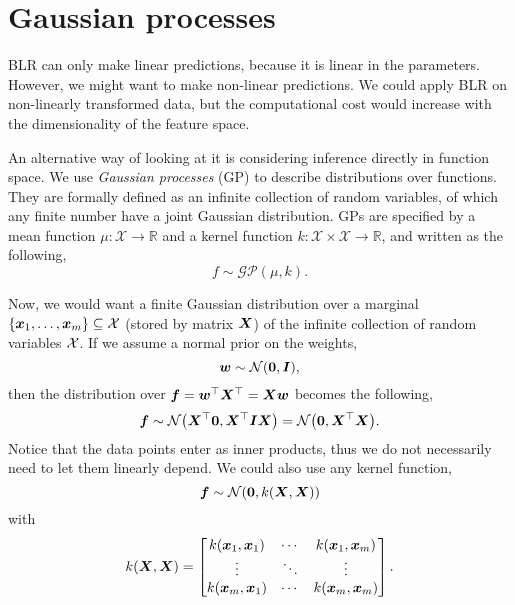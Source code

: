 \section{Gaussian processes}

BLR can only make linear predictions, because it is linear in the parameters.
However, we might want to make non-linear predictions. We could apply BLR on
non-linearly transformed data, but
the computational cost would increase with the dimensionality of the feature
space.

An alternative way of looking at it is considering inference directly in
function space. We use \textit{Gaussian processes} (GP) to describe
distributions over functions. They are formally defined as an infinite
collection of random variables, of which any finite number have a joint Gaussian
distribution. GPs are specified by a mean function $\mu:
\mathcal{X}\to\mathbb{R}$ and a kernel function
$k:\mathcal{X}\times\mathcal{X}\to\mathbb{R}$, and written as the
following, \[
  f \sim \mathcal{GP}(\mu, k)
.\]

Now, we would want a finite Gaussian distribution over a marginal
$\{\bm{x}_1,\ldots,\bm{x}_m\} \subseteq \mathcal{X}$ (stored by matrix $\bm{X}$) of
the infinite collection of random variables $\mathcal{X}$. If we assume a normal prior on
the weights, \[
  \bm{w} \sim \mathcal{N}(\bm{0},\bm{I})
,\]
then the distribution
over $\bm{f} = \bm{w}^\top \bm{X}^\top = \bm{X} \bm{w}$
becomes the following, \[
  \vec{f} \sim \mathcal{N} \lft( \transpose{\mat{X}} \vec{0},\transpose{\mat{X}}
  \mat{I} \mat{X} \rgt) = \mathcal{N} \lft( \vec{0},\transpose{\mat{X}} \mat{X} \rgt)
.\]
Notice that the data points enter as inner products, thus we do not necessarily
need to let them linearly depend. We could also use any kernel
function,
\[
  \bm{f} \sim \mathcal{N}(\bm{0}, k(\bm{X}, \bm{X}))
\]
with \[
  k(\bm{X}, \bm{X}) = \begin{bmatrix}
    k(\bm{x}_1,\bm{x}_1) & \cdots & k(\bm{x}_1,\bm{x}_m) \\
    \vdots & \ddots & \vdots \\
    k(\bm{x}_m,\bm{x}_1) & \cdots & k(\bm{x}_m,\bm{x}_m)
  \end{bmatrix}
.\]

